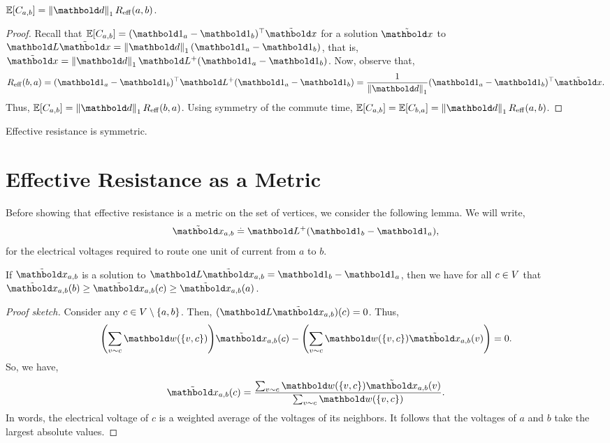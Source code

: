 \begin{lem}
$\E{C_{a,b}} = \norm{\vd}_1 \Reff(a,b)$.
\end{lem}
\begin{proof} Recall that $\E{C_{a,b}} = \trans{(\vOne_a - \vOne_b)}\elx$ for a solution $\elx$ to $\mL\elx = \norm{\vd}_1 (\vOne_a - \vOne_b)$, that is, $\elx = \norm{\vd}_1\pinv{\mL}(\vOne_a - \vOne_b)$. Now, observe that, \begin{align*}
    \Reff(b,a) = \trans{(\vOne_a - \vOne_b)}\pinv{\mL}(\vOne_a - \vOne_b) = \frac{1}{\norm{\vd}_1}\trans{(\vOne_a - \vOne_b)}\elx.
\end{align*} Thus, $\E{C_{a,b}} = \norm{\vd}_1 \Reff(b,a)$. Using symmetry of the commute time, $\E{C_{a,b}} = \E{C_{b,a}} = \norm{\vd}_1 \Reff(a,b)$.
\end{proof}

\begin{cor}\label{cor:effective_resistance_symmetric}
Effective resistance is symmetric.
\end{cor}

\section{Effective Resistance as a Metric}

Before showing that effective resistance is a metric on the set of vertices, we consider the following lemma. We will write, \begin{align}
    \elx_{a,b} \defeq \pinv{\mL}(\vOne_b - \vOne_a),
\end{align} for the electrical voltages required to route one unit of current from $a$ to $b$.

\begin{lem}\label{lem:voltages_are_weighted_average}
If $\elx_{a,b}$ is a solution to $\mL\elx_{a,b} = \vOne_b - \vOne_a$, then we have for all $c \in V$ that $\elx_{a,b}(b) \geq \elx_{a,b}(c) \geq \elx_{a,b}(a)$.
\end{lem}
\begin{proof}[Proof sketch] Consider any $c \in V \setminus \{a,b\}$. Then, $(\mL\elx_{a,b})(c) = 0$. Thus, \begin{align*}
    \parentheses*{\sum_{v \sim c} \vw(\{v,c\})} \elx_{a,b}(c) - \parentheses*{\sum_{v \sim c} \vw(\{v,c\}) \elx_{a,b}(v)} = 0.
\end{align*} So, we have, \begin{align*}
    \elx_{a,b}(c) = \frac{\sum_{v \sim c} \vw(\{v,c\}) \elx_{a,b}(v)}{\sum_{v \sim c} \vw(\{v,c\})}.
\end{align*} In words, the electrical voltage of $c$ is a weighted average of the voltages of its neighbors. It follows that the voltages of $a$ and $b$ take the largest absolute values.
\end{proof}

